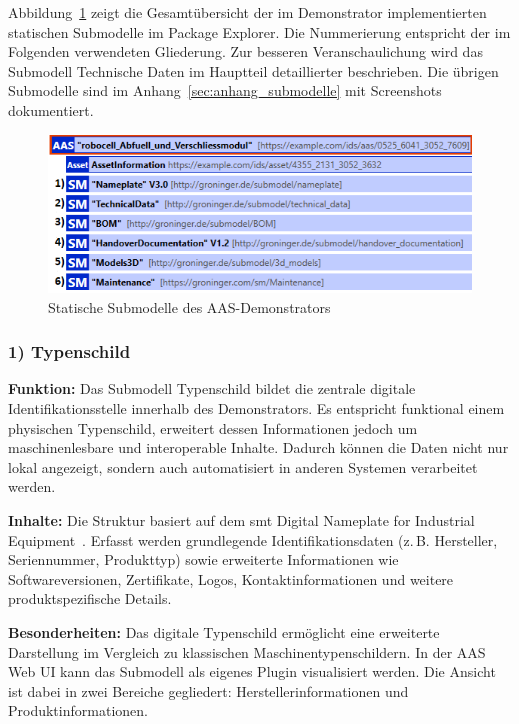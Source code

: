 Abbildung~\ref{fig:StatischeSubmodelle} zeigt die Gesamtübersicht der im Demonstrator implementierten statischen Submodelle im Package Explorer. 
Die Nummerierung entspricht der im Folgenden verwendeten Gliederung. 
Zur besseren Veranschaulichung wird das Submodell Technische Daten im Hauptteil detaillierter beschrieben. 
Die übrigen Submodelle sind im Anhang~\ref{sec:anhang_submodelle} mit Screenshots dokumentiert.

\begin{figure}[htbp]
    \centering
        \includegraphics[width=1\textwidth]{Bilder/Ergebnisse/PE/robocell.PNG}
    \caption{Statische Submodelle des AAS-Demonstrators}
    \label{fig:StatischeSubmodelle}
\end{figure}

\subsubsection*{1) Typenschild}
\vspace{-0.5em}
\textbf{Funktion:}  
Das Submodell Typenschild bildet die zentrale digitale Identifikationsstelle innerhalb des Demonstrators. 
Es entspricht funktional einem physischen Typenschild, erweitert dessen Informationen jedoch um maschinenlesbare und interoperable Inhalte. 
Dadurch können die Daten nicht nur lokal angezeigt, sondern auch automatisiert in anderen Systemen verarbeitet werden.

\textbf{Inhalte:}  
Die Struktur basiert auf dem \acs{smt} Digital Nameplate for Industrial Equipment~\cite{SpezifikationTypenschild}.  
Erfasst werden grundlegende Identifikationsdaten (z.\,B. Hersteller, Seriennummer, Produkttyp) 
sowie erweiterte Informationen wie Softwareversionen, Zertifikate, Logos, Kontaktinformationen 
und weitere produktspezifische Details.

\textbf{Besonderheiten:}  
Das digitale Typenschild ermöglicht eine erweiterte Darstellung im Vergleich zu klassischen Maschinentypenschildern.  
In der AAS Web UI kann das Submodell als eigenes Plugin visualisiert werden. 
Die Ansicht ist dabei in zwei Bereiche gegliedert: Herstellerinformationen und Produktinformationen.

